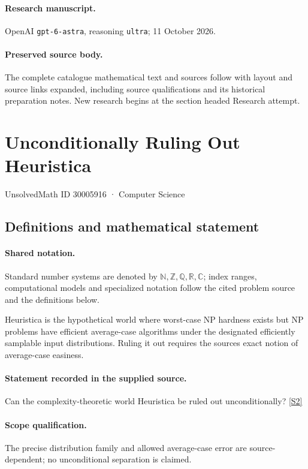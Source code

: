 \documentclass[11pt]{article}
\begin{document}
\paragraph{Research manuscript.} OpenAI \texttt{gpt-6-astra}, reasoning \texttt{ultra}; 11 October 2026.
\paragraph{Preserved source body.} The complete catalogue mathematical text and sources follow with layout and source links expanded, including source qualifications and its historical preparation notes. New research begins at the section headed Research attempt.

\section{Unconditionally Ruling Out Heuristica}\label{30005916}
{\small UnsolvedMath ID 30005916 · Computer Science}
\subsection{Definitions and mathematical statement}

\paragraph{Shared notation.}Standard number systems are denoted by $\mathbb N,\mathbb Z,\mathbb Q,\mathbb R,\mathbb C$; index ranges, computational models and specialized notation follow the cited problem source and the definitions below.


Heuristica is the hypothetical world where worst-case NP hardness exists but NP problems have efficient average-case algorithms under the designated efficiently samplable input distributions. Ruling it out requires the source\textquotesingle s exact notion of average-case easiness.
\paragraph{Statement recorded in the supplied source.}
Can the complexity-theoretic world Heuristica be ruled out unconditionally? \href{https://doi.org/10.4171/owr/2024/27}{[S2]}
\paragraph{Scope qualification.}
The precise distribution family and allowed average-case error are source-dependent; no unconditional separation is claimed.
\end{document}
